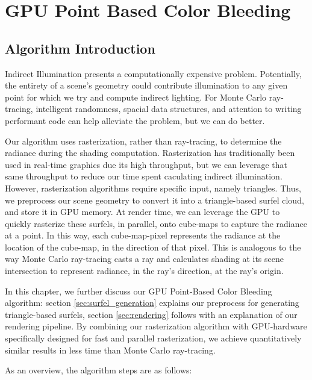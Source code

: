\chapter{GPU Point Based Color Bleeding}

\section{Algorithm Introduction}

Indirect Illumination presents a computationally expensive problem. Potentially, the entirety of a scene's geometry could contribute illumination to any given point for which we try and compute indirect lighting. For Monte Carlo ray-tracing, intelligent randomness, spacial data structures, and attention to writing performant code can help alleviate the problem, but we can do better.

Our algorithm uses rasterization, rather than ray-tracing, to determine the radiance during the shading computation. Rasterization has traditionally been used in real-time graphics due its high throughput, but we can leverage that same throughput to reduce our time spent caculating indirect illumination. However, rasterization algorithms require specific input, namely triangles. Thus, we preprocess our scene geometry to convert it into a triangle-based surfel cloud, and store it in GPU memory. At render time, we can leverage the GPU to quickly rasterize these surfels, in parallel, onto cube-maps to capture the radiance at a point. In this way, each cube-map-pixel represents the radiance at the location of the cube-map, in the direction of that pixel. This is analogous to the way Monte Carlo ray-tracing casts a ray and calculates shading at its scene intersection to represent radiance, in the ray's direction, at the ray's origin.

In this chapter, we further discuss our GPU Point-Based Color Bleeding algorithm: section \ref{sec:surfel_generation} explains our preprocess for generating triangle-based surfels, section \ref{sec:rendering} follows with an explanation of our rendering pipeline. By combining our rasterization algorithm with GPU-hardware specifically designed for fast and parallel rasterization, we achieve quantitatively similar results in less time than Monte Carlo ray-tracing.

As an overview, the algorithm steps are as follows:


